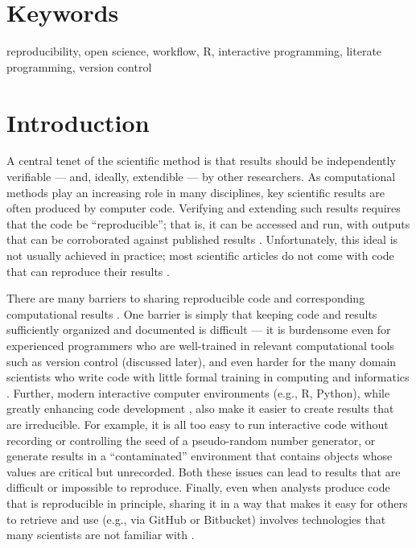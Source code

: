 \documentclass[9pt,a4paper]{extarticle}
\begin{document}
\section*{Keywords}

reproducibility, open science, workflow, R, interactive programming,
literate programming, version control

\clearpage

\pagestyle{main}


\section*{Introduction}

A central tenet of the scientific method is that results should be
independently verifiable --- and, ideally, extendible --- by other
researchers. As computational methods play an increasing role in many
disciplines, key scientific results are often produced by computer code.
Verifying and extending such results requires that the code be
``reproducible''; that is, it can be accessed and run, with outputs that
can be corroborated against published results \cite{Buckheit1995,
Gentleman2007, Peng2011, Ince2012, Morin2012, Sandve2013,
Easterbrook2014, Stodden2016, Lowndes2017}. Unfortunately, this ideal is
not usually achieved in practice; most scientific articles do not come
with code that can reproduce their results \cite{Ioannidis2009,
Merali2010, Ioannidis2014, Stodden2018}.

There are many barriers to sharing reproducible code and corresponding
computational results \cite{kitzes2017}. One barrier is simply that
keeping code and results sufficiently organized and documented is
difficult --- it is burdensome even for experienced programmers who are
well-trained in relevant computational tools such as version control
(discussed later), and even harder for the many domain scientists who
write code with little formal training in computing and informatics
\cite{Wilson2014}. Further, modern interactive computer environments
(e.g., R, Python), while greatly enhancing code development
\cite{Findler2002}, also make it easier to create results that are
irreducible. For example, it is all too easy to run interactive code
without recording or controlling the seed of a pseudo-random number
generator, or generate results in a ``contaminated'' environment that
contains objects whose values are critical but unrecorded. Both these
issues can lead to results that are difficult or impossible to
reproduce. Finally, even when analysts produce code that is reproducible
in principle, sharing it in a way that makes it easy for others to
retrieve and use (e.g., via GitHub or Bitbucket) involves technologies
that many scientists are not familiar with \cite{Marwick2017,
Stodden2018}.
\end{document}
